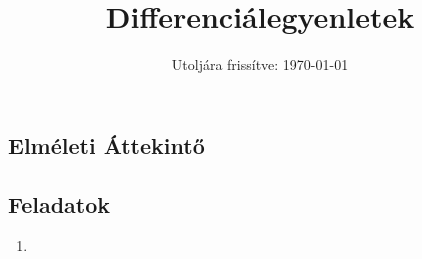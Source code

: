 \documentclass[a4paper, 12pt]{scrartcl}
\title{Differenciálegyenletek}
\date{Utoljára frissítve: \today}
\begin{document}
\maketitle

\subsection{Elméleti Áttekintő}

\clearpage
\subsection{Feladatok}

\begin{enumerate}
  \item
\end{enumerate}
\end{document}
